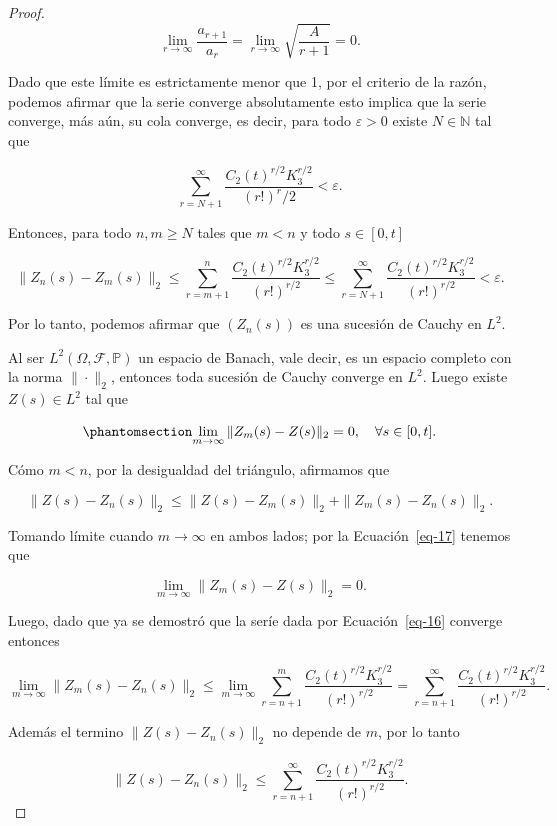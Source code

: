 \documentclass[
  spanish,
  us-letterpaper,
]{scrreprt}
\theoremstyle{plain}
\theoremstyle{plain}
\theoremstyle{definition}
\theoremstyle{plain}
\theoremstyle{remark}
\begin{document}
\begin{proof}
\[
\lim\limits_{r\rightarrow\infty}\frac{a_{r+1}}{a_r}=\lim\limits_{r\rightarrow\infty}\sqrt{\frac{A}{r+1}}=0.
\]

Dado que este límite es estrictamente menor que 1, por el criterio de la
razón, podemos afirmar que la serie converge absolutamente esto implica
que la serie converge, más aún, su cola converge, es decir, para todo
\(\varepsilon>0\) existe \(N\in \mathbb{N}\) tal que

\[
    \sum\limits_{r=N+1}^{\infty}\frac{C_2(t)^{r/2}K_3^{r/2}}{(r!)^r/2}<\varepsilon.
\]

Entonces, para todo \(n,m\geq N\) tales que \(m<n\) y todo
\(s\in [0,t]\)

\[
    \|Z_n(s)-Z_m(s)\|_2\leq \sum\limits_{r=m+1}^n\frac{C_2(t)^{r/2}K_3^{r/2}}{(r!)^{r/2}}\leq \sum\limits_{r=N+1}^{\infty} \frac{C_2(t)^{r/2}K_3^{r/2}}{(r!)^{r/2}}<\varepsilon.
\]

Por lo tanto, podemos afirmar que \((Z_n(s))\) es una sucesión de Cauchy
en \(L^2\).

Al ser \(L^2(\Omega, \mathcal{F},\mathbb{P})\) un espacio de Banach,
vale decir, es un espacio completo con la norma \(\|\cdot\|_2\),
entonces toda sucesión de Cauchy converge en \(L^2\). Luego existe
\(Z(s)\in L^2\) tal que

\begin{equation}\phantomsection\label{eq-17}{
    \lim\limits_{m\rightarrow \infty}\|Z_m(s)-Z(s)\|_2=0, \ \ \ \forall s\in [0,t].
}\end{equation}

Cómo \(m<n\), por la desigualdad del triángulo, afirmamos que

\[
    \|Z(s)-Z_n(s)\|_2\leq \|Z(s)-Z_m(s)\|_2+\|Z_m(s)-Z_n(s)\|_2.
\]

Tomando límite cuando \(m\rightarrow\infty\) en ambos lados; por la
Ecuación~\ref{eq-17} tenemos que

\[
    \lim\limits_{m\rightarrow \infty}\|Z_m(s)-Z(s)\|_2=0.
\]

Luego, dado que ya se demostró que la seríe dada por
Ecuación~\ref{eq-16} converge entonces

\[
    \lim\limits_{m\rightarrow\infty} \|Z_m(s)-Z_n(s)\|_2\leq \lim\limits_{m\rightarrow\infty}\sum\limits_{r=n+1}^m\frac{C_2(t)^{r/2}K_3^{r/2}}{(r!)^{r/2}}=\sum\limits_{r=n+1}^{\infty}\frac{C_2(t)^{r/2}K_3^{r/2}}{(r!)^{r/2}}.
\]

Además el termino \(\|Z(s)-Z_n(s)\|_2\) no depende de \(m\), por lo
tanto

\[
    \|Z(s)-Z_n(s)\|_2\leq \sum\limits_{r=n+1}^{\infty}\frac{C_2(t)^{r/2}K_3^{r/2}}{(r!)^{r/2}}.
\]


\end{proof}
\end{document}
